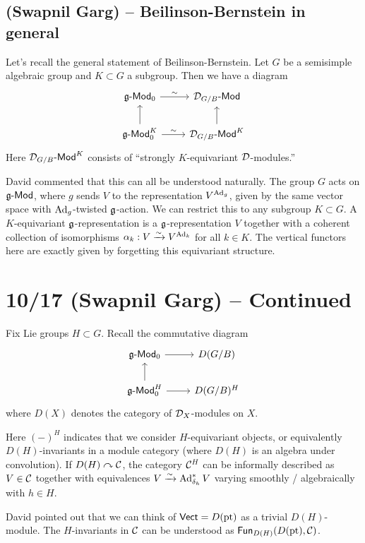 \documentclass{article}
\begin{document}
\subsection{(Swapnil Garg) -- Beilinson-Bernstein in general}

Let's recall the general statement of Beilinson-Bernstein.
Let $G$ be a semisimple algebraic group and $K \subset G$ a subgroup.
Then we have a diagram
\[
	\begin{tikzcd}
		\gfr\dMod_0 \rar["\sim"] & \Dc_{G/B}\dMod \\
		\gfr\dMod_0^K \uar \rar["\sim"] & \Dc_{G/B}\dMod^K \uar
	\end{tikzcd}
\]
Here $\mathcal{D}_{G/B}\text{-}\mathsf{Mod}^K$ consists of ``strongly $K$-equivariant $\mathcal{D}$-modules.''

\begin{rmk}
	David commented that this can all be understood naturally.
	The group $G$ acts on $\mathfrak{g}\text{-}\mathsf{Mod}$, where $g$ sends $V$ to the representation $V^{\operatorname{Ad}_g}$, given by the same vector space with $\operatorname{Ad}_g$-twisted $\mathfrak{g}$-action.
	We can restrict this to any subgroup $K \subset G$.
	A $K$-equivariant $\mathfrak{g}$-representation is a $\mathfrak{g}$-representation $V$ together with a coherent collection of isomorphisms $\alpha_k: V \xrightarrow{\sim} V^{\operatorname{Ad}_k}$ for all $k \in K$.
	The vertical functors here are exactly given by forgetting this equivariant structure.
\end{rmk}

\section{10/17 (Swapnil Garg) -- Continued}

Fix Lie groups $H \subset G$.
Recall the commutative diagram
\[
	\begin{tikzcd}
		\gfr\dMod_0 \rar & D(G/B) \\
		\gfr\dMod_0^H \uar \rar & D(G/B)^H
	\end{tikzcd}
\]
where $D(X)$ denotes the category of $\mathcal{D}_X$-modules on $X$.

Here $(-)^H$ indicates that we consider $H$-equivariant objects, or equivalently $D(H)$-invariants in a module category (where $D(H)$ is an algebra under convolution).
If $D(H) \curvearrowright \mathcal{C}$, the category $\mathcal{C}^H$ can be informally described as $V \in \mathcal{C}$ together with equivalences $V \xrightarrow{\sim} \operatorname{Ad}_{\delta_h}^* V$ varying smoothly / algebraically with $h \in H$.

\begin{rmk}
	David pointed out that we can think of $\mathsf{Vect} = D(\operatorname{pt})$ as a trivial $D(H)$-module.
	The $H$-invariants in $\mathcal{C}$ can be understood as $\mathsf{Fun}_{D(H)}(D(\operatorname{pt}), \mathcal{C})$.
\end{rmk}
\end{document}
